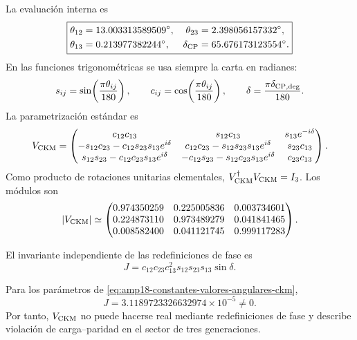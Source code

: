 La evaluación interna es
\begin{equation}
 \label{eq:amp18-constantes-valores-angulares-ckm}
 \boxed{\begin{aligned}
 \theta_{12}&=13.003313589509^\circ,&
 \theta_{23}&=2.398056157332^\circ,\\
 \theta_{13}&=0.213977382244^\circ,&
 \delta_{\rm CP}&=65.676173123554^\circ.
 \end{aligned}}
\end{equation}
En las funciones trigonométricas se usa siempre la carta en radianes:
\[
 s_{ij}=\sin\!\left(\frac{\pi\theta_{ij}}{180}\right),
 \qquad
 c_{ij}=\cos\!\left(\frac{\pi\theta_{ij}}{180}\right),
 \qquad
 \delta=\frac{\pi\delta_{{\rm CP},\rm deg}}{180}.
\]
La parametrización estándar es
\begin{equation}
 \label{eq:amp18-constantes-vckm}
 V_{\rm CKM}=
 \begin{pmatrix}
 c_{12}c_{13}&s_{12}c_{13}&s_{13}e^{-i\delta}\\
 -s_{12}c_{23}-c_{12}s_{23}s_{13}e^{i\delta}&
 c_{12}c_{23}-s_{12}s_{23}s_{13}e^{i\delta}&s_{23}c_{13}\\
 s_{12}s_{23}-c_{12}c_{23}s_{13}e^{i\delta}&
 -c_{12}s_{23}-s_{12}c_{23}s_{13}e^{i\delta}&c_{23}c_{13}
 \end{pmatrix}.
\end{equation}
Como producto de rotaciones unitarias elementales,
\(V_{\rm CKM}^{\dagger}V_{\rm CKM}=I_3\). Los módulos son
\begin{equation}
 \label{eq:amp18-constantes-modulos-vckm}
 |V_{\rm CKM}|\simeq
 \begin{pmatrix}
 0.974350259&0.225005836&0.003734601\\
 0.224873110&0.973489279&0.041841465\\
 0.008582400&0.041121745&0.999117283
 \end{pmatrix}.
\end{equation}

El invariante independiente de las redefiniciones de fase es
\begin{equation}
 \label{eq:amp18-constantes-jarlskog}
 J=c_{12}c_{23}c_{13}^2s_{12}s_{23}s_{13}\sin\delta.
\end{equation}

\begin{theorem}
Para los parámetros de
\eqref{eq:amp18-constantes-valores-angulares-ckm},
\begin{equation}
 \label{eq:amp18-constantes-jarlskog-valor}
 \boxed{J=3.1189723326632974\times10^{-5}\neq0.}
\end{equation}
Por tanto, \(V_{\rm CKM}\) no puede hacerse real mediante redefiniciones de
fase y describe violación de carga--paridad en el sector de tres
generaciones.
\end{theorem}

